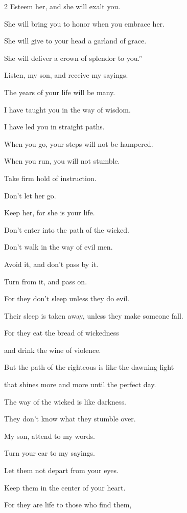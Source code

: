 \begin{multicols}{2}
\myverse{}Esteem her, and she will exalt you.

She will bring you to honor when you embrace her.


\myverse{}She will give to your head a garland of grace.

She will deliver a crown of splendor to you.”


\vspace{\baselineskip} 
\myverse{}Listen, my son, and receive my sayings.

The years of your life will be many.


\myverse{}I have taught you in the way of wisdom.

I have led you in straight paths.


\myverse{}When you go, your steps will not be hampered.

When you run, you will not stumble.


\myverse{}Take firm hold of instruction.

Don’t let her go.

Keep her, for she is your life.


\myverse{}Don’t enter into the path of the wicked.

Don’t walk in the way of evil men.


\myverse{}Avoid it, and don’t pass by it.

Turn from it, and pass on.


\myverse{}For they don’t sleep unless they do evil.

Their sleep is taken away, unless they make someone fall.


\myverse{}For they eat the bread of wickedness

and drink the wine of violence.


\myverse{}But the path of the righteous is like the dawning light

that shines more and more until the perfect day.


\myverse{}The way of the wicked is like darkness.

They don’t know what they stumble over.


\vspace{\baselineskip} 
\myverse{}My son, attend to my words.

Turn your ear to my sayings.


\myverse{}Let them not depart from your eyes.

Keep them in the center of your heart.


\myverse{}For they are life to those who find them,


\end{multicols}
